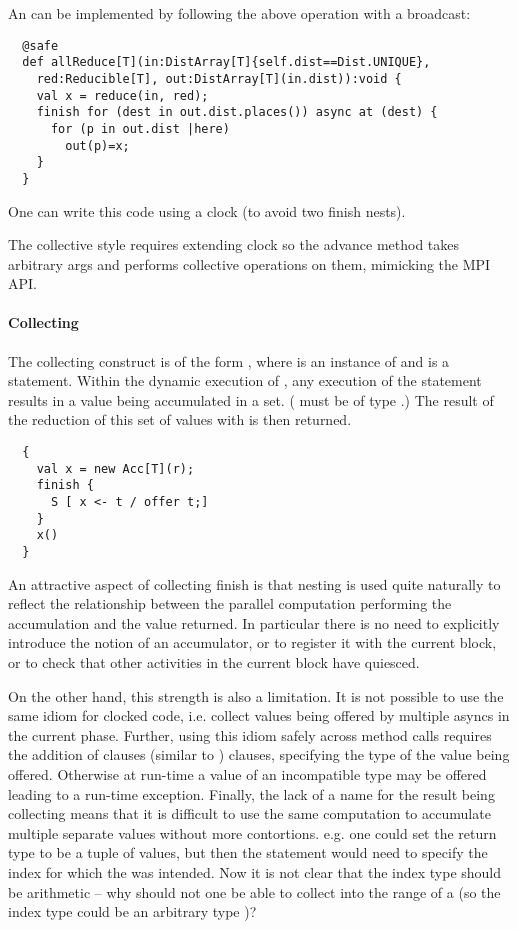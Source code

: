 An  can be implemented by following the above
operation with a broadcast:
\begin{lstlisting}
  @safe
  def allReduce[T](in:DistArray[T]{self.dist==Dist.UNIQUE},
    red:Reducible[T], out:DistArray[T](in.dist)):void {
    val x = reduce(in, red);
    finish for (dest in out.dist.places()) async at (dest) {
      for (p in out.dist |here)
        out(p)=x;
    }
  }
\end{lstlisting}
One can write this code using a clock (to avoid two finish nests).

The collective style requires extending clock so the advance method
takes arbitrary args and performs collective operations on them,
mimicking the MPI API.

\paragraph{Collecting }

The collecting  construct is of the form , where  is an instance of  and
 is a statement. Within the dynamic execution of , any
execution of the statement  results in a value 
being accumulated in a set. ( must be of type .) The
result of the reduction of this set of  values with 
is then returned.

\begin{lstlisting}
  {
    val x = new Acc[T](r);
    finish {
      S [ x <- t / offer t;]
    }
    x()
  }
\end{lstlisting}

An attractive aspect of collecting finish is that nesting is used
quite naturally to reflect the relationship between the parallel
computation performing the accumulation and the value returned. In
particular there is no need to explicitly introduce the notion of an
accumulator, or to register it with the current block, or to check
that other activities in the current block have quiesced.

On the other hand, this strength is also a limitation. It is not
possible to use the same idiom for clocked code, i.e.{} collect values
being offered by multiple  asyncs in the current phase.
Further, using this idiom safely across method calls requires the
addition of  clauses (similar to )
clauses, specifying the type of the value being offered. Otherwise at
run-time a value of an incompatible type may be offered leading to a
run-time exception. Finally, the lack of a name for the result being
collecting means that it is difficult to use the same computation to
accumulate multiple separate values without more contortions. e.g.{}
one could set the return type to be a tuple of values, but then the
 statement would need to specify the index for which the
 was intended. Now it is not clear that the index type
should be arithmetic -- why should not one be able to collect into the
range of a  (so the index type could be an arbitrary
type )?

